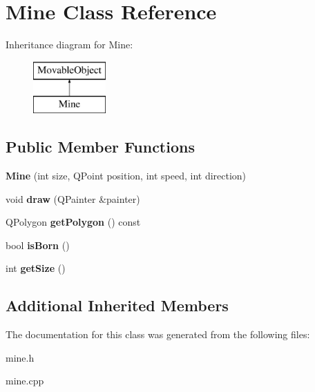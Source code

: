 \hypertarget{classMine}{\section{Mine Class Reference}
\label{classMine}
}
Inheritance diagram for Mine\-:\begin{figure}[H]
\begin{center}
\leavevmode
\includegraphics[height=2.000000cm]{classMine}
\end{center}
\end{figure}
\subsection*{Public Member Functions}
\begin{DoxyCompactItemize}
\item 
\hypertarget{classMine_a9d89e6260c96465e3050842bd7845778}{{\bfseries Mine} (int size, Q\-Point position, int speed, int direction)}\label{classMine_a9d89e6260c96465e3050842bd7845778}

\item 
\hypertarget{classMine_acc87edf6b5376a8e75c9673ca7414ab7}{void {\bfseries draw} (Q\-Painter \&painter)}\label{classMine_acc87edf6b5376a8e75c9673ca7414ab7}

\item 
\hypertarget{classMine_a877c2e7620c3c74d67e394e04f2ecf28}{Q\-Polygon {\bfseries get\-Polygon} () const }\label{classMine_a877c2e7620c3c74d67e394e04f2ecf28}

\item 
\hypertarget{classMine_a8adfed8ef08c5be72b3591c6cd4486db}{bool {\bfseries is\-Born} ()}\label{classMine_a8adfed8ef08c5be72b3591c6cd4486db}

\item 
\hypertarget{classMine_a0c0dc484ff8f9e36c1fa8e724b9269f8}{int {\bfseries get\-Size} ()}\label{classMine_a0c0dc484ff8f9e36c1fa8e724b9269f8}

\end{DoxyCompactItemize}
\subsection*{Additional Inherited Members}


The documentation for this class was generated from the following files\-:\begin{DoxyCompactItemize}
\item 
mine.\-h\item 
mine.\-cpp\end{DoxyCompactItemize}
